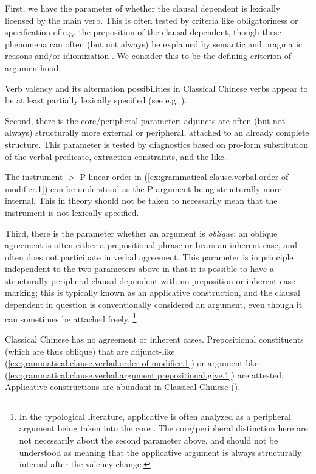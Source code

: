 \documentclass[UTF8, a4paper, oneside, scheme=plain, 12pt]{ctexrep}
\newcommand*{\textgt}{$>$ }
\newcommand*{\citepage}[1]{p.~{#1}}
\newcommand*{\citepages}[1]{pp.~{#1}}
\begin{document}
First, we have the parameter of whether the clausal dependent is lexically licensed by the main verb.
This is often tested by criteria like obligatoriness or specification of e.g. the preposition of the clausal dependent,
though these phenomena can often (but not always) be explained by semantic and pragmatic reasons and/or idiomization
\citep[\citepages{112-117, 125, 128, 212}]{mcinnerney2022argument}.
We consider this to be the defining criterion of argumenthood.

Verb valency and its alternation possibilities in Classical Chinese verbs appear to be at least partially lexically specified (see e.g. ).

Second, there is the core/peripheral parameter: adjuncts are often (but not always) structurally more external or peripheral, attached to an already complete structure.
This parameter is tested by diagnostics based on pro-form substitution of the verbal predicate, extraction constraints, and the like. 

The instrument \textgt P linear order in (\ref{ex:grammatical.clause.verbal.order-of-modifier.1}) can be understood as the P argument being structurally more internal.
This in theory should not be taken to necessarily mean that the instrument is not lexically specified.

Third, there is the parameter whether an argument is  \emph{oblique}:
an oblique agreement is often either a prepositional phrase or bears an inherent case,
and often does not participate in verbal agreement.
This parameter is in principle independent to the two parameters above in that 
it is possible to have a structurally peripheral clausal dependent with no preposition or inherent case marking;
this is typically known as an applicative construction, and the clausal dependent in question is conventionally considered an argument, even though it can sometimes be attached freely.%
\footnote{
    In the typological literature, applicative is often analyzed as a peripheral argument being taken into the core \citep[\citepage{169}]{dixon2009basic}.
    The core/peripheral distinction here are not necessarily about the second parameter above, and should not be understood as meaning that the applicative argument is always structurally internal after the valency change.
}

Classical Chinese has no agreement or inherent cases.
Prepositional constituents (which are thus oblique) that are adjunct-like (\ref{ex:grammatical.clause.verbal.order-of-modifier.1}) or argument-like (\ref{ex:grammatical.clause.verbal.argument.prepositional.give.1}) are attested.
Applicative constructions are abundant in Classical Chinese ().
\end{document}
